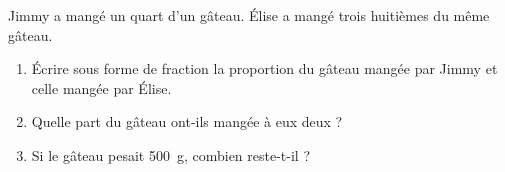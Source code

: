 
\begin{exercice}\label{exosmath-0973}

Jimmy a mangé un quart d'un gâteau. Élise a mangé trois huitièmes du même gâteau.  
\begin{enumerate}
    \item
        Écrire sous forme de fraction la proportion du gâteau mangée par Jimmy et celle mangée par Élise.
    \item
 Quelle part du gâteau ont-ils mangée à eux deux ?
 \item
     Si le gâteau pesait \SI{500}{\gram}, combien reste-t-il ?
\end{enumerate}

\end{exercice}
